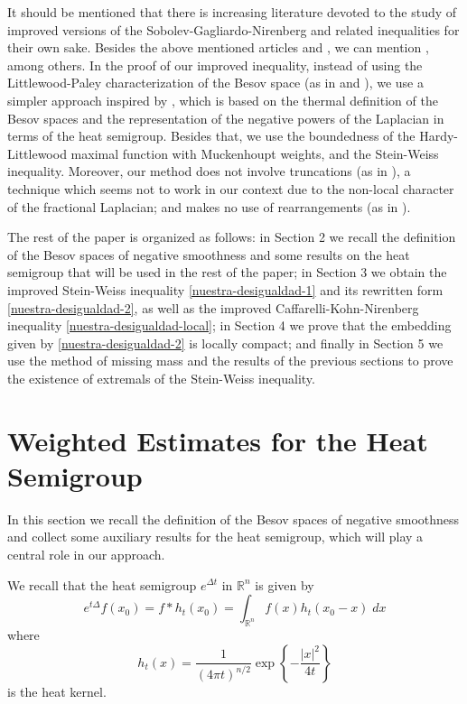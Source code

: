\documentclass[12pt]{amsart}
\newcommand {\R}{\mathbb{R}}
\newcommand {\be}{\begin{equation}}
\newcommand {\ee}{\end{equation}}
\begin{document}
It should be mentioned that there is increasing literature devoted to the study of 
improved versions of the Sobolev-Gagliardo-Nirenberg and related inequalities for their own sake. Besides the above mentioned articles \cite{GMO} and \cite{PP}, we can mention  \cite{Bahouri2005, Ch, Hajaiej2012, Kolyada2014, Ledoux2003, VanSchaftingen2014}, among others. In the proof of our improved \label{nuestra-desigualdad-1} inequality, instead of using the Littlewood-Paley characterization of the Besov space 
(as in \cite{GMO} and \cite{Bahouri2005}), we use a simpler approach inspired by \cite{Ch}, which is based on the thermal definition of the Besov spaces and the representation of the negative powers of the Laplacian in terms of the heat semigroup. 
Besides that, we use the boundedness of the Hardy-Littlewood maximal function with  Muckenhoupt weights,  and the Stein-Weiss inequality. Moreover, our method does not involve 
truncations (as in \cite{Ledoux2003}), a technique which seems not to work in our context due to the non-local character of the fractional Laplacian; and makes no use of rearrangements (as in \cite{Kolyada2014}). 

\medskip

The rest of the paper is organized as follows: in Section 2 we recall the definition of the Besov spaces of negative smoothness and some results on the heat semigroup that will be used in the rest of the paper; in Section 3 we obtain the improved Stein-Weiss inequality \eqref{nuestra-desigualdad-1} and its 
rewritten form \eqref{nuestra-desigualdad-2}, as well as the improved Caffarelli-Kohn-Nirenberg inequality \eqref{nuestra-desigualdad-local}; in Section 4 we prove that the embedding given by \eqref{nuestra-desigualdad-2} is locally compact; and finally in Section 5 we use the method of missing mass and the results of the previous sections to prove the existence of extremals of the Stein-Weiss inequality.

\section{Weighted Estimates for the Heat Semigroup}

In this section we recall the definition of the Besov spaces of negative smoothness and collect some auxiliary results for the heat semigroup,
which will play a central role in our approach.

We recall that the heat semigroup $e^{\Delta t}$ in $\R^n$ is given by
\be e^{t \Delta} f(x_0)= f*h_t(x_0) = \int_{\R^n} f(x) h_t(x_0-x) \; dx \label{heat-semigroup} \ee
where
$$ h_t(x)= \frac{1}{(4\pi t)^{n/2}} \exp \left\{-\frac{|x|^2}{4t} \right\} $$ 
is the heat kernel.
\end{document}
